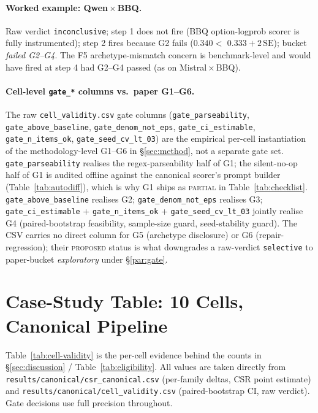 \paragraph{Worked example: Qwen\,$\times$\,BBQ.} Raw verdict
\texttt{inconclusive}; step 1 does not fire (BBQ option-logprob
scorer is fully instrumented); step 2 fires because G2 fails
($0.340 <$ $0.333 + 2\,\mathrm{SE}$); bucket \emph{failed
G2--G4}. The F5 archetype-mismatch concern is benchmark-level and
would have fired at step 4 had G2--G4 passed
(as on Mistral\,$\times$\,BBQ).

\paragraph{Cell-level \texttt{gate\_*} columns vs.\ paper G1--G6.}
The raw \texttt{cell\_validity.csv} gate columns
(\texttt{gate\_parseability}, \texttt{gate\_above\_baseline},
\texttt{gate\_denom\_not\_eps}, \texttt{gate\_ci\_estimable},
\texttt{gate\_n\_items\_ok}, \texttt{gate\_seed\_cv\_lt\_03}) are
the empirical per-cell instantiation of the methodology-level
G1--G6 in \S\ref{sec:method}, not a separate gate set.
\texttt{gate\_parseability} realises the regex-parseability half
of G1; the silent-no-op half of G1 is audited offline against the
canonical scorer's prompt builder
(Table~\ref{tab:autodiff}), which is why G1 ships as \textsc{partial}
in Table~\ref{tab:checklist}.
\texttt{gate\_above\_baseline} realises G2;
\texttt{gate\_denom\_not\_eps} realises G3;
\texttt{gate\_ci\_estimable} + \texttt{gate\_n\_items\_ok} +
\texttt{gate\_seed\_cv\_lt\_03} jointly realise G4 (paired-bootstrap
feasibility, sample-size guard, seed-stability guard). The CSV
carries no direct column for G5 (archetype disclosure) or G6
(repair-regression); their \textsc{proposed} status is what
downgrades a raw-verdict \texttt{selective} to paper-bucket
\emph{exploratory} under \S\ref{par:gate}.

\section{Case-Study Table: 10 Cells, Canonical Pipeline}
\label{app:casetable}

Table~\ref{tab:cell-validity} is the per-cell evidence behind the
counts in \S\ref{sec:discussion} / Table~\ref{tab:eligibility}. All
values are taken directly from
\texttt{results/canonical/csr\_canonical.csv} (per-family deltas,
CSR point estimate) and
\texttt{results/canonical/cell\_validity.csv} (paired-bootstrap CI,
raw verdict). Gate decisions use full precision throughout.

